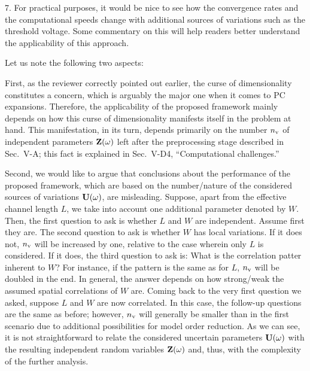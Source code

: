 \begin{reviewer}
7. For practical purposes, it would be nice to see how the convergence rates and the computational speeds change with additional sources of variations such as the threshold voltage. Some commentary on this will help readers better understand the applicability of this approach.
\end{reviewer}
\begin{authors}
Let us note the following two aspects:

First, as the reviewer correctly pointed out earlier, the curse of dimensionality constitutes a concern, which is arguably the major one when it comes to PC expansions.
Therefore, the applicability of the proposed framework mainly depends on how this curse of dimensionality manifests itself in the problem at hand.
This manifestation, in its turn, depends primarily on the number ${n_\text{v}}$ of independent parameters $\mathbf{Z}(\omega)$ left after the preprocessing stage described in Sec.~V-A; this fact is explained in Sec.~V-D4, ``Computational challenges.''

Second, we would like to argue that conclusions about the performance of the proposed framework, which are based on the number/nature of the considered sources of variations $\mathbf{U}(\omega)$, are misleading.
Suppose, apart from the effective channel length $L$, we take into account one additional parameter denoted by $W$.
Then, the first question to ask is whether $L$ and $W$ are independent.
Assume first they are.
The second question to ask is whether $W$ has local variations.
If it does not, ${n_\text{v}}$ will be increased by one, relative to the case wherein only $L$ is considered.
If it does, the third question to ask is: What is the correlation patter inherent to $W$?
For instance, if the pattern is the same as for $L$, ${n_\text{v}}$ will be doubled in the end.
In general, the answer depends on how strong/weak the assumed spatial correlations of $W$ are.
Coming back to the very first question we asked, suppose $L$ and $W$ are now correlated.
In this case, the follow-up questions are the same as before; however, ${n_\text{v}}$ will generally be smaller than in the first scenario due to additional possibilities for model order reduction.
As we can see, it is not straightforward to relate the considered uncertain parameters $\mathbf{U}(\omega)$ with the resulting independent random variables $\mathbf{Z}(\omega)$ and, thus, with the complexity of the further analysis.


\end{authors}
